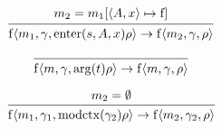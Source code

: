 \documentclass[12pt]{article}
\begin{document}
\[
  \begin{prooftree}
    \hypo{m_2 = m_1[\langle A, x\rangle \mapsto \mathrm{f}]}
    \infer1{\mathrm{f}\langle m_1, \gamma, \mathrm{enter}(s, A, x) \rho\rangle \to \mathrm{f}\langle m_2, \gamma, \rho\rangle}
  \end{prooftree}
\]

\[
  \begin{prooftree}
    \infer0{\mathrm{f}\langle m, \gamma, \mathrm{arg}(t) \rho\rangle \to \mathrm{f}\langle m, \gamma, \rho\rangle}
  \end{prooftree}
\]

\[
  \begin{prooftree}
    \hypo{m_2 = \emptyset}
    \infer1{\mathrm{f}\langle m_1, \gamma_1, \mathrm{modctx}(\gamma_2) \rho\rangle \to \mathrm{f}\langle m_2, \gamma_2, \rho\rangle}
  \end{prooftree}
\]
\end{document}
